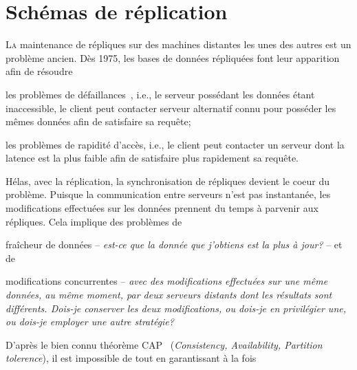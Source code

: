 
\chapter{Schémas de réplication}

\minitoc

\lettrine{L}a maintenance de répliques sur des machines distantes les unes des
autres est un problème ancien. Dès 1975, les bases de données répliquées font
leur apparition~\cite{johnson1975maintenance} afin de résoudre
\begin{inparaenum}[(i)]
\item les problèmes de défaillances~\cite{alsberg1976principle}, i.e., le
  serveur possédant les données étant inaccessible, le client peut contacter
  serveur alternatif connu pour posséder les mêmes données afin de satisfaire sa
  requête;
\item les problèmes de rapidité d'accès, i.e., le client peut contacter un
  serveur dont la latence est la plus faible afin de satisfaire plus rapidement
  sa requête.
\end{inparaenum}

Hélas, avec la réplication, la synchronisation de répliques devient le coeur du
problème. Puisque la communication entre serveurs n'est pas instantanée, les
modifications effectuées sur les données prennent du temps à parvenir aux
répliques. Cela implique des problèmes de
\begin{inparaenum}[(i)]
\item fraîcheur de données -- \emph{est-ce que la donnée que j'obtiens est la
    plus à jour?} -- et de
\item modifications concurrentes -- \emph{avec des modifications effectuées sur
    une même données, au même moment, par deux serveurs distants dont les
    résultats sont différents. Dois-je conserver les deux modifications, ou
    dois-je en privilégier une, ou dois-je employer une autre stratégie?}
\end{inparaenum}

D'après le bien connu théorème CAP~\cite{gilbert2002brewer} (\emph{Consistency,
  Availability, Partition tolerence}), il est impossible de  tout en garantissant à la fois 


